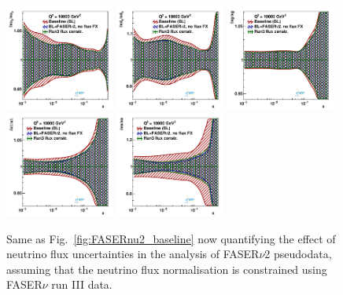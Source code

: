 \begin{figure}[t]
\centering
\includegraphics[width=0.32\textwidth]{plots/proton_fasernu2/FASERv2_flux_run3/fred05fcorr05_fluxR3_FASERv2_q2_10000_pdf_uv_ratio.pdf}
\includegraphics[width=0.32\textwidth]{plots/proton_fasernu2/FASERv2_flux_run3/fred05fcorr05_fluxR3_FASERv2_q2_10000_pdf_dv_ratio.pdf}
\includegraphics[width=0.32\textwidth]{plots/proton_fasernu2/FASERv2_flux_run3/fred05fcorr05_fluxR3_FASERv2_q2_10000_pdf_g_ratio.pdf}\\
\includegraphics[width=0.32\textwidth]{plots/proton_fasernu2/FASERv2_flux_run3/fred05fcorr05_fluxR3_FASERv2_q2_10000_pdf_Sea_ratio.pdf}
\includegraphics[width=0.32\textwidth]{plots/proton_fasernu2/FASERv2_flux_run3/fred05fcorr05_fluxR3_FASERv2_q2_10000_pdf_s_ratio.pdf}
\caption{
  Same as Fig.~\ref{fig:FASERnu2_baseline} now quantifying the
  effect of neutrino flux uncertainties in the analysis of FASER$\nu$2 pseudodata, assuming that the neutrino flux normalisation is constrained using FASER$\nu$ run III data. 
}
\label{fig:FASERv2_flux_unc_run3}
\end{figure}
